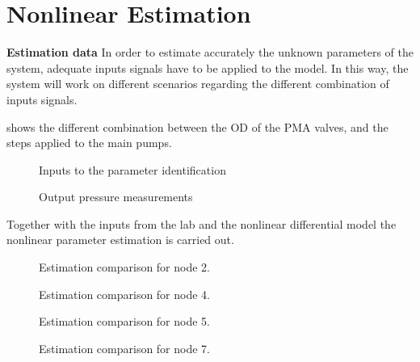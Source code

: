 \chapter{Nonlinear Estimation}
\label{NonLinResults}

\textbf{Estimation data}
In order to estimate accurately the unknown parameters of the system, adequate inputs signals have to be applied to the model. In this way, the system 
will work on different scenarios regarding the different combination of inputs signals. 

 shows the different combination between the OD of the PMA valves, and the steps applied to the main pumps. 


\begin{figure}[H]
  \centering
  \begin{minipage}[b]{0.45\textwidth}
     
    \caption{Inputs to the parameter identification}
  \end{minipage}
  \hfill
  \begin{minipage}[b]{0.45\textwidth}
     
    \caption{Output pressure measurements}
  \end{minipage}
  \label{fig:nonlinearpumps}
\end{figure}



Together with the inputs from the lab and the nonlinear differential model the nonlinear parameter estimation is carried out. 

\begin{figure}[H]
  \centering
  \begin{minipage}[b]{0.45\textwidth}
    
    \caption{Estimation comparison for node 2.}
  \end{minipage}
  \hfill
  \begin{minipage}[b]{0.45\textwidth}
    
    \caption{Estimation comparison for node 4.}
  \end{minipage}
\end{figure}

\begin{figure}[H]
  \centering
  \begin{minipage}[b]{0.45\textwidth}
    
    \caption{Estimation comparison for node 5.}
  \end{minipage}
  \hfill
  \begin{minipage}[b]{0.45\textwidth}
    
    \caption{Estimation comparison for node 7.}
  \end{minipage}
\end{figure}

